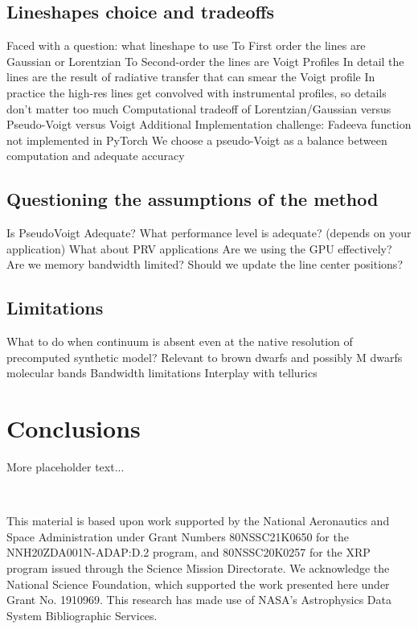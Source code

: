 \documentclass[modern]{aastex631}
\begin{document}
\subsection{Lineshapes choice and tradeoffs}
\begin{outline}
    \1 Faced with a question: what lineshape to use
    \2 To First order the lines are Gaussian or Lorentzian
    \2 To Second-order the lines are Voigt Profiles
    \2 In detail the lines are the result of radiative transfer that can smear the Voigt profile
    \2 In practice the high-res lines get convolved with instrumental profiles, so details don't matter too much
    \1 Computational tradeoff of Lorentzian/Gaussian versus Pseudo-Voigt versus Voigt
    \2 Additional Implementation challenge: Fadeeva function not implemented in PyTorch
    \1 We choose a pseudo-Voigt as a balance between computation and adequate accuracy
\end{outline}

\subsection{Questioning the assumptions of the method}

\begin{outline}
    \1 Is PseudoVoigt Adequate?
    \1 What performance level is adequate? (depends on your application)
    \1 What about PRV applications
    \1 Are we using the GPU effectively? Are we memory bandwidth limited?
    \1 Should we update the line center positions?
\end{outline}

\subsection{Limitations}
\begin{outline}
    \1 What to do when continuum is absent even at the native resolution of precomputed synthetic model?
    \1 Relevant to brown dwarfs and possibly M dwarfs molecular bands
    \1 Bandwidth limitations
    \1 Interplay with tellurics
\end{outline}



\section{Conclusions}
More placeholder text...


\

\begin{acknowledgements}
    This material is based upon work supported by the National Aeronautics and Space Administration under Grant Numbers 80NSSC21K0650 for the NNH20ZDA001N-ADAP:D.2 program, and 80NSSC20K0257 for the XRP program issued through the Science Mission Directorate.  We acknowledge the National Science Foundation, which supported the work presented here under Grant No. 1910969.  This research has made use of NASA's Astrophysics Data System Bibliographic Services.
\end{acknowledgements}
\end{document}
